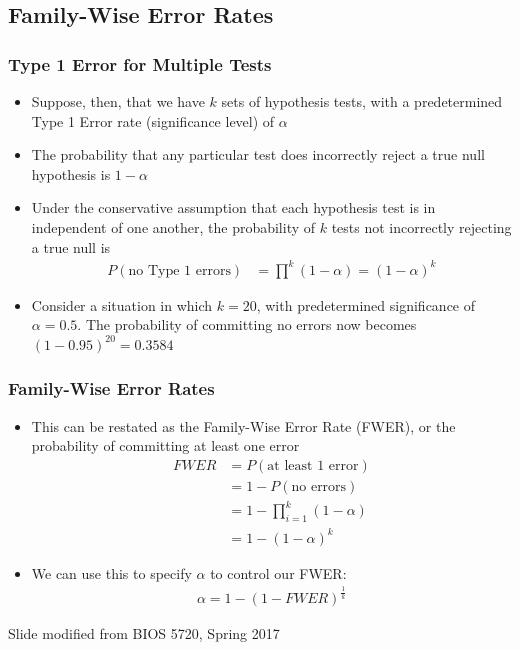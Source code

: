 \documentclass[11pt]{beamer}
\begin{document}
\subsection{Family-Wise Error Rates}

\begin{frame}
\frametitle{Type 1 Error for Multiple Tests}
{
\begin{itemize}
\item Suppose, then, that we have $k$ sets of hypothesis tests, with a predetermined Type 1 Error rate (significance level) of $\alpha$ \\
\item The probability that any particular test does incorrectly reject a true null hypothesis is $1 - \alpha$ \\
\item Under the conservative assumption that each hypothesis test is in independent of one another, the probability of $k$ tests not incorrectly rejecting a true null is
\begin{align*}
P(\text{no Type 1 errors}) &= \prod^k (1 - \alpha) = (1-\alpha)^k
\end{align*}
\item Consider a situation in which $k = 20$, with predetermined significance of $\alpha = 0.5$. The probability of committing no errors now becomes $(1 - 0.95)^{20} = 0.3584$ \\
\end{itemize}
}
\end{frame}

\begin{frame}
\frametitle{Family-Wise Error Rates}
{
\begin{itemize}
\item This can be restated as the Family-Wise Error Rate (FWER), or the probability of committing at least one error
\begin{align*}
FWER &= P(\text{at least 1 error}) \\[4pt]
&= 1 - P(\text{no errors}) \\[4pt]
&= 1 - \prod_{i=1}^k (1 - \alpha) \\[4pt]
&= 1 - (1 - \alpha)^k
\end{align*} 
\item We can use this to specify $\alpha$ to control our FWER:
\begin{align*}
\alpha = 1 - (1 - FWER)^{\frac{1}{k}}
\end{align*}
\end{itemize}
}
\tiny{Slide modified from BIOS 5720, Spring 2017}
\end{frame}
\end{document}
